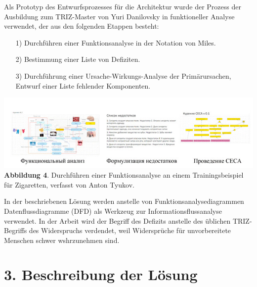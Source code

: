\documentclass[11pt,a4paper]{article}
\begin{document}
Als Prototyp des Entwurfsprozesses für die Architektur wurde der Prozess der
Ausbildung zum TRIZ-Master von Yuri Danilovsky in funktioneller Analyse
verwendet, der aus den folgenden Etappen besteht:
\begin{itemize}
\item[1)] Durchführen einer Funktionsanalyse in der Notation von Miles.
\item[2)] Bestimmung einer Liste von Defiziten.
\item[3)] Durchführung einer Ursache-Wirkungs-Analyse der Primärursachen,
  Entwurf einer Liste fehlender Komponenten.
\end{itemize}
\begin{center}
  \includegraphics[width=.95\textwidth]{image002.jpg}\\
  \textbf{Abbildung 4}. Durchführen einer Funktionsanalyse an einem
  Trainingsbeispiel für Zigaretten, verfasst von Anton Tyukov.
\end{center}
In der beschriebenen Lösung werden anstelle von Funktionsanalysediagrammen
Datenflussdiagramme (DFD) als Werkzeug zur Informationsflussanalyse verwendet.
In der Arbeit wird der Begriff des Defizits anstelle des üblichen
TRIZ-Begriffs des Widerspruchs verdendet, weil Widersprüche für unvorbereitete
Menschen schwer wshrzunehmen sind.

\section*{3. Beschreibung der Lösung}
\end{document}
